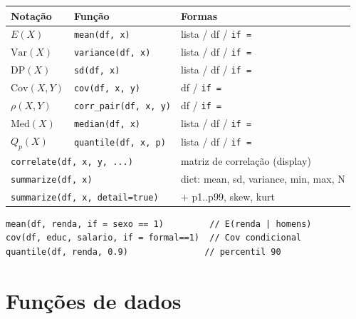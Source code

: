 \begin{center}
\begin{tabular}{lll}
\toprule
\textbf{Notação} & \textbf{Função} & \textbf{Formas} \\
\midrule
$E(X)$
  & \texttt{mean(df, x)}
  & lista / df / \texttt{if =} \\
$\mathrm{Var}(X)$
  & \texttt{variance(df, x)}
  & lista / df / \texttt{if =} \\
$\mathrm{DP}(X)$
  & \texttt{sd(df, x)}
  & lista / df / \texttt{if =} \\
$\mathrm{Cov}(X,Y)$
  & \texttt{cov(df, x, y)}
  & df / \texttt{if =} \\
$\rho(X,Y)$
  & \texttt{corr\_pair(df, x, y)}
  & df / \texttt{if =} \\
$\mathrm{Med}(X)$
  & \texttt{median(df, x)}
  & lista / df / \texttt{if =} \\
$Q_p(X)$
  & \texttt{quantile(df, x, p)}
  & lista / df / \texttt{if =} \\
\midrule
\multicolumn{2}{l}{\texttt{correlate(df, x, y, ...)}}
  & matriz de correlação (display) \\
\multicolumn{2}{l}{\texttt{summarize(df, x)}}
  & dict: mean, sd, variance, min, max, N \\
\multicolumn{2}{l}{\texttt{summarize(df, x, detail=true)}}
  & + p1..p99, skew, kurt \\
\bottomrule
\end{tabular}
\end{center}

\begin{lstlisting}[style=inline]
mean(df, renda, if = sexo == 1)         // E(renda | homens)
cov(df, educ, salario, if = formal==1)  // Cov condicional
quantile(df, renda, 0.9)               // percentil 90
\end{lstlisting}

\section{Funções de dados}

